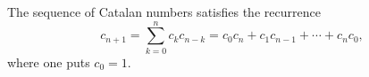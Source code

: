 

\setcounter{section}{4}
\setcounter{subsection}{1}
\setcounter{dfn}{1}

\begin{thm}
The sequence of Catalan numbers satisfies the recurrence
\begin{equation}
\label{eqn:CatalanRecursion}
c_{n+1} = \sum_{k=0}^n c_k c_{n-k} = c_0c_n + c_1c_{n-1} + \cdots + c_nc_0,
\end{equation}
where one puts $c_0 = 1$.
\end{thm}



